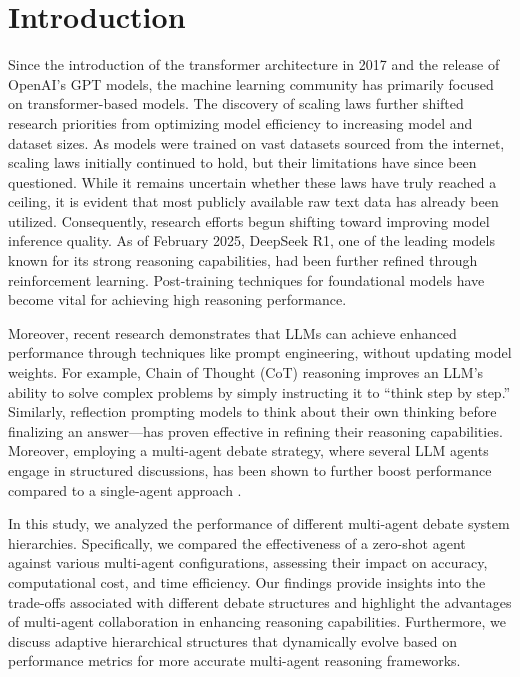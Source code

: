 \section{Introduction}
\label{sec:introduction}

Since the introduction of the transformer architecture in 2017\cite{vaswani2023attentionneed} and the release of OpenAI’s GPT models\cite{radford2018improving}\cite{radford2019language}\cite{brown2020languagemodelsfewshotlearners}, the machine learning community has primarily focused on transformer-based models. The discovery of scaling laws\cite{kaplan2020scalinglawsneurallanguage} further shifted research priorities from optimizing model efficiency to increasing model and dataset sizes. As models were trained on vast datasets sourced from the internet, scaling laws initially continued to hold, but their limitations have since been questioned. While it remains uncertain whether these laws have truly reached a ceiling, it is evident that most publicly available raw text data has already been utilized. Consequently, research efforts begun shifting toward improving model inference quality. As of February 2025, DeepSeek R1, one of the leading models known for its strong reasoning capabilities, had been further refined through reinforcement learning\cite{deepseekai2025deepseekr1incentivizingreasoningcapability}. Post-training techniques for foundational models have become vital for achieving high reasoning performance.

Moreover, recent research demonstrates that LLMs can achieve enhanced performance through techniques like prompt engineering, without updating model weights. For example, Chain of Thought (CoT) reasoning\cite{kojima2023largelanguagemodelszeroshot} improves an LLM’s ability to solve complex problems by simply instructing it to “think step by step.” Similarly, reflection prompting\cite{madaan2023selfrefineiterativerefinementselffeedback}\cite{shinn2023reflexionlanguageagentsverbal} models to think about their own thinking before finalizing an answer—has proven effective in refining their reasoning capabilities. Moreover, employing a multi-agent debate strategy, where several LLM agents engage in structured discussions, has been shown to further boost performance compared to a single-agent approach \cite{du2023improvingfactualityreasoninglanguage}.

In this study, we analyzed the performance of different multi-agent debate system hierarchies. Specifically, we compared the effectiveness of a zero-shot agent against various multi-agent configurations, assessing their impact on accuracy, computational cost, and time efficiency. Our findings provide insights into the trade-offs associated with different debate structures and highlight the advantages of multi-agent collaboration in enhancing reasoning capabilities. Furthermore, we discuss adaptive hierarchical structures that dynamically evolve based on performance metrics for more accurate multi-agent reasoning frameworks.
